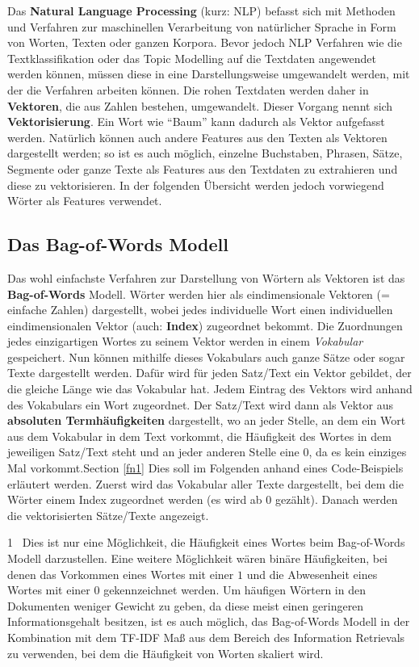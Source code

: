 \documentclass[11pt]{article}
\begin{document}
    Das \textbf{Natural Language Processing} (kurz: NLP) befasst sich mit
Methoden und Verfahren zur maschinellen Verarbeitung von natürlicher
Sprache in Form von Worten, Texten oder ganzen Korpora. Bevor jedoch NLP
Verfahren wie die Textklassifikation oder das Topic Modelling auf die
Textdaten angewendet werden können, müssen diese in eine
Darstellungsweise umgewandelt werden, mit der die Verfahren arbeiten
können. Die rohen Textdaten werden daher in \textbf{Vektoren}, die aus
Zahlen bestehen, umgewandelt. Dieser Vorgang nennt sich
\textbf{Vektorisierung}. Ein Wort wie ``Baum'' kann dadurch als Vektor
aufgefasst werden. Natürlich können auch andere Features aus den Texten
als Vektoren dargestellt werden; so ist es auch möglich, einzelne
Buchstaben, Phrasen, Sätze, Segmente oder ganze Texte als Features aus
den Textdaten zu extrahieren und diese zu vektorisieren. In der
folgenden Übersicht werden jedoch vorwiegend Wörter als Features
verwendet.

    \hypertarget{das-bag-of-words-modell}{%
\subsection{Das Bag-of-Words Modell}\label{das-bag-of-words-modell}}

Das wohl einfachste Verfahren zur Darstellung von Wörtern als Vektoren
ist das \textbf{Bag-of-Words} Modell. Wörter werden hier als
eindimensionale Vektoren (= einfache Zahlen) dargestellt, wobei jedes
individuelle Wort einen individuellen eindimensionalen Vektor (auch:
\textbf{Index}) zugeordnet bekommt. Die Zuordnungen jedes einzigartigen
Wortes zu seinem Vektor werden in einem \emph{Vokabular} gespeichert.
Nun können mithilfe dieses Vokabulars auch ganze Sätze oder sogar Texte
dargestellt werden. Dafür wird für jeden Satz/Text ein Vektor gebildet,
der die gleiche Länge wie das Vokabular hat. Jedem Eintrag des Vektors
wird anhand des Vokabulars ein Wort zugeordnet. Der Satz/Text wird dann
als Vektor aus \textbf{absoluten Termhäufigkeiten} dargestellt, wo an
jeder Stelle, an dem ein Wort aus dem Vokabular in dem Text vorkommt,
die Häufigkeit des Wortes in dem jeweiligen Satz/Text steht und an jeder
anderen Stelle eine \(0\), da es kein einziges Mal
vorkommt.Section \ref{fn1} Dies soll im Folgenden anhand eines
Code-Beispiels erläutert werden. Zuerst wird das Vokabular aller Texte
dargestellt, bei dem die Wörter einem Index zugeordnet werden (es wird
ab \(0\) gezählt). Danach werden die vektorisierten Sätze/Texte
angezeigt.

\hypertarget{fn1}{}
1 ~Dies ist nur eine Möglichkeit, die Häufigkeit eines Wortes beim
Bag-of-Words Modell darzustellen. Eine weitere Möglichkeit wären binäre
Häufigkeiten, bei denen das Vorkommen eines Wortes mit einer \(1\) und
die Abwesenheit eines Wortes mit einer \(0\) gekennzeichnet werden. Um
häufigen Wörtern in den Dokumenten weniger Gewicht zu geben, da diese
meist einen geringeren Informationsgehalt besitzen, ist es auch möglich,
das Bag-of-Words Modell in der Kombination mit dem TF-IDF Maß aus dem
Bereich des Information Retrievals zu verwenden, bei dem die Häufigkeit
von Worten skaliert wird.
\end{document}
